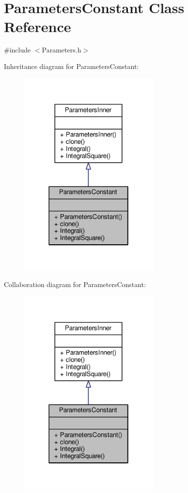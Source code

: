 \hypertarget{classParametersConstant}{}\section{Parameters\+Constant Class Reference}
\label{classParametersConstant}


{\ttfamily \#include $<$Parameters.\+h$>$}



Inheritance diagram for Parameters\+Constant\+:
\nopagebreak
\begin{figure}[H]
\begin{center}
\leavevmode
\includegraphics[width=202pt]{classParametersConstant__inherit__graph}
\end{center}
\end{figure}


Collaboration diagram for Parameters\+Constant\+:
\nopagebreak
\begin{figure}[H]
\begin{center}
\leavevmode
\includegraphics[width=202pt]{classParametersConstant__coll__graph}
\end{center}
\end{figure}
